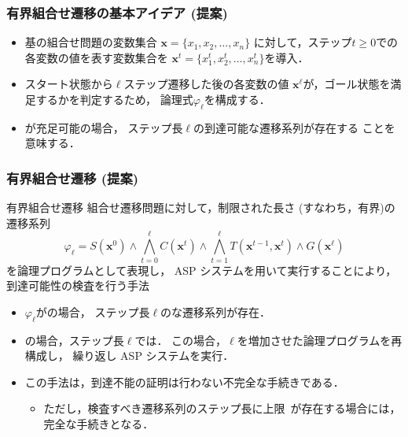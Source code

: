 \documentclass[dvipdfmx,11pt]{beamer}
\begin{document}
\begin{frame}
  \frametitle{有界組合せ遷移の基本アイデア (提案)}
  \begin{itemize}
  \item 基の組合せ問題の変数集合
    $\bm{x} = \{x_1,x_2,\ldots,x_n\}$
    に対して，ステップ$t\geq 0$での各変数の値を表す変数集合を
    $\bm{x}^{t} = \{x_1^t,x_2^t,\ldots,x_n^t\}$を導入．
  \item スタート状態から$\ell$ステップ遷移した後の各変数の値
    $\bm{x}^{\ell}$が，ゴール状態を満足するかを判定するため，
    論理式$\varphi_{\ell}$を構成する．
  \end{itemize}
  \begin{itemize}
  \item \bm{$\varphi_{\ell}$}が充足可能の場合，
    ステップ長$\ell$の到達可能な遷移系列が存在する
    ことを意味する．
  \end{itemize}
\end{frame}
\begin{frame}%
  \frametitle{有界組合せ遷移 (提案)} 
  \begin{alertblock}{有界組合せ遷移}\centering
    組合せ遷移問題に対して，制限された長さ (すなわち，有界)の
    遷移系列
    \[
    \varphi_{\ell} = S(\bm{x}^0)  
    \land \bigwedge_{t=0}^{\ell} C(\bm{x}^t) 
    \land \bigwedge_{t=1}^{\ell} T(\bm{x}^{t-1},\bm{x}^{t}) 
    \land G(\bm{x}^\ell)  
    \]
    を論理プログラムとして表現し，
    ASP システムを用いて実行することにより，到達可能性の検査を行う手法
  \end{alertblock}
  \begin{itemize}
  \item $\varphi_{\ell}$がの場合，
    ステップ長$\ell$のな遷移系列が存在．
  \item {}の場合，ステップ長$\ell$では．
    この場合，$\ell$を増加させた論理プログラムを再構成し，
    繰り返し ASP システムを実行．
  \item この手法は，到達不能の証明は行わない不完全な手続きである．
    \begin{itemize}
      \item ただし，検査すべき遷移系列のステップ長に上限~\footnotemark[2]
        が存在する場合には，完全な手続きとなる．
    \end{itemize}
  \end{itemize}
\end{frame}
\end{document}
